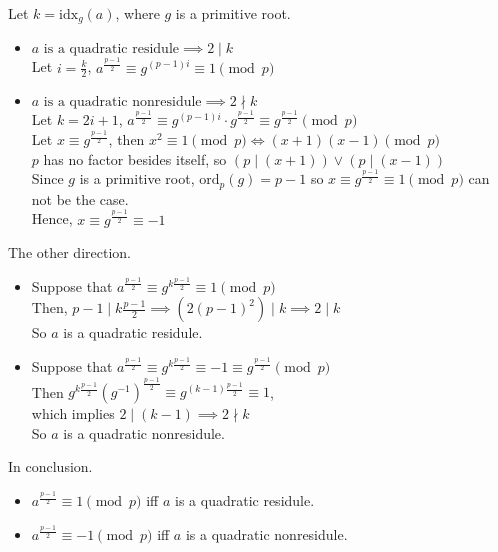 \documentclass{article}
\newcommand{\ord}{\mathrm{ord}}
\newcommand{\idx}{\mathrm{idx}}
\begin{document}
Let $k=\idx_g(a)$, where $g$ is a primitive root.
\begin{itemize}
	\item $a\text{ is a quadratic residule}\implies 2\mid k$\\
		Let $i=\frac{k}{2}$, $a^{\frac{p-1}{2}}\equiv g^{(p-1)i}\equiv 1\pmod p$
	\item $a\text{ is a quadratic nonresidule}\implies 2\nmid k$\\
		Let $k=2i+1$, $a^{\frac{p-1}{2}}\equiv g^{(p-1)i}\cdot g^{\frac{p-1}{2}}\equiv g^{\frac{p-1}{2}}\pmod p$\\
		Let $x\equiv g^{\frac{p-1}{2}}$, then $x^2\equiv 1\pmod p\iff (x+1)(x-1)\pmod p$\\
		$p$ has no factor besides itself, so $\left(p\mid (x+1)\right)\lor \left(p\mid (x-1)\right)$\\
		Since $g$ is a primitive root, $\ord_p(g)=p-1$ so $x\equiv g^{\frac{p-1}{2}}\equiv 1\pmod p$ can not be the case.\\
		Hence, $x\equiv g^{\frac{p-1}{2}}\equiv -1$
\end{itemize}

The other direction.
\begin{itemize}
	\item Suppose that $a^{\frac{p-1}{2}}\equiv g^{k\frac{p-1}{2}}\equiv 1\pmod p$\\
		Then, $p-1\mid k\frac{p-1}{2}\implies \left(2{(p-1)}^2\right)\mid k\implies 2\mid k$\\
		So $a$ is a quadratic residule.
	\item Suppose that $a^{\frac{p-1}{2}}\equiv g^{k\frac{p-1}{2}}\equiv -1\equiv g^{\frac{p-1}{2}}\pmod p$\\
		Then $g^{k\frac{p-1}{2}}{\left(g^{-1}\right)}^{\frac{p-1}{2}}\equiv g^{(k-1)\frac{p-1}{2}}\equiv 1$,\\
		which implies $2\mid (k-1)\implies 2\nmid k$\\
		So $a$ is a quadratic nonresidule.
\end{itemize}

In conclusion.
\begin{itemize}
	\item $a^{\frac{p-1}{2}}\equiv 1\pmod p$ iff $a$ is a quadratic residule.
	\item $a^{\frac{p-1}{2}}\equiv -1\pmod p$ iff $a$ is a quadratic nonresidule.
\end{itemize}
\end{document}
